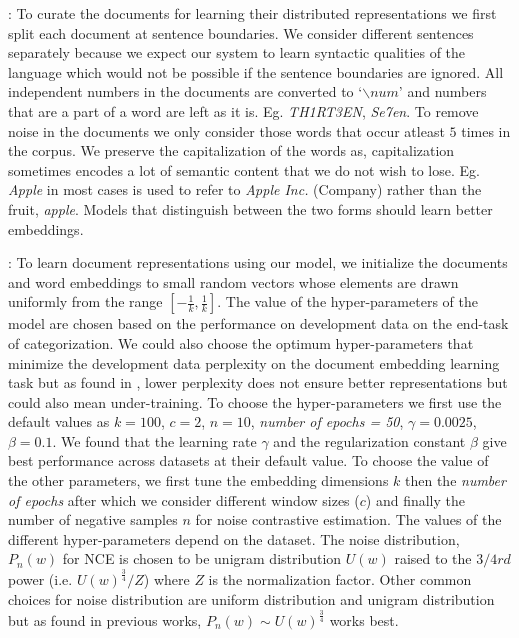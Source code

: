  : To curate the documents for learning their distributed representations we first split each document at sentence boundaries. We consider different sentences separately because we expect our system to learn syntactic qualities of the language which would not be possible if the sentence boundaries are ignored.
All independent numbers in the documents are converted to `$\backslash num$' and numbers that are a part of a word are left as it is. Eg. \emph{TH1RT3EN}, \emph{Se7en}. 
To remove noise in the documents we only consider those words that occur atleast $5$ times in the corpus.
We preserve the capitalization of the words as, capitalization sometimes encodes a lot of semantic content that we do not wish to lose. Eg. \emph{Apple} in most cases is used to refer to \emph{Apple Inc.} (Company) rather than the fruit, \emph{apple}. Models that distinguish between the two forms should learn better embeddings.

 : To learn document representations using our model, we initialize the documents and word embeddings to small random vectors whose elements are drawn uniformly from the range $[-\frac{1}{k}, \frac{1}{k}]$. 
The value of the hyper-parameters of the model are chosen based on the performance on development data on the end-task of categorization. 
We could also choose the optimum hyper-parameters that minimize the development data perplexity on the document embedding learning task but as found in \citep{mnih2013learning}, lower perplexity does not ensure better representations but could also mean under-training. 
To choose the hyper-parameters we first use the default values as $k = 100$, $c = 2$, $n = 10$, \emph{number of epochs = 50}, $\gamma = 0.0025$, $\beta = 0.1$. 
We found that the learning rate $\gamma$ and the regularization constant $\beta$ give best performance across datasets at their default value. To choose the value of the other parameters, we first tune the embedding dimensions $k$ then the \emph{number of epochs} after which we consider different window sizes ($c$) and finally the number of negative samples $n$ for noise contrastive estimation. The values of the different hyper-parameters depend on the dataset. 
The noise distribution, $P_{n}(w)$ for NCE is chosen to be unigram distribution $U(w)$ raised to the $3/4rd$ power (i.e. $U(w)^{\frac{3}{4}}/Z$) where $Z$ is the normalization factor. Other common choices for noise distribution are uniform distribution and unigram distribution but as found in previous works, $P_{n}(w) \sim U(w)^{\frac{3}{4}}$ works best.

